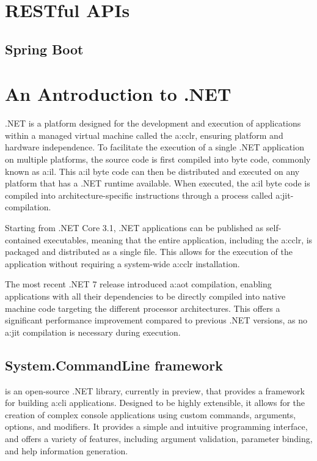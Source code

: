 \section{RESTful APIs}


\subsection{Spring Boot}


\section{An Antroduction to .NET}\label{sec:tf-dotnet}

.NET is a platform designed for the development and execution of applications within a managed virtual machine called the \gls{a:cclr}, ensuring platform and hardware independence. To facilitate the execution of a single .NET application on multiple platforms, the source code is first compiled into byte code, commonly known as \gls{a:il}. This \gls{a:il} byte code can then be distributed and executed on any platform that has a .NET runtime available. When executed, the \gls{a:il} byte code is compiled into architecture-specific instructions through a process called \gls{a:jit}-compilation.

Starting from .NET Core 3.1, .NET applications can be published as self-contained executables, meaning that the entire application, including the \gls{a:cclr}, is packaged and distributed as a single file. This allows for the execution of the application without requiring a system-wide \gls{a:cclr} installation.

The most recent .NET 7 release introduced \gls{a:aot} compilation, enabling applications with all their dependencies to be directly compiled into native machine code targeting the different processor architectures. This offers a significant performance improvement compared to previous .NET versions, as no \gls{a:jit} compilation is necessary during execution.

\subsection{System.CommandLine framework}

 is an open-source .NET library, currently in preview, that provides a framework for building \gls{a:cli} applications. Designed to be highly extensible, it allows for the creation of complex console applications using custom commands, arguments, options, and modifiers. It provides a simple and intuitive programming interface, and offers a variety of features, including argument validation, parameter binding, and help information generation.

